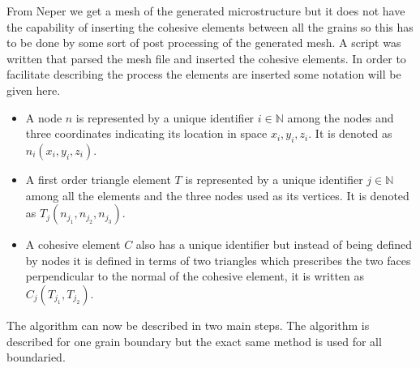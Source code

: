 \documentclass[grain_boundary_law.tex]{subfiles}
\begin{document}
From Neper we get a mesh of the generated microstructure but it does not have the capability of inserting the cohesive elements between all the grains so this has to be done by some sort of post processing of the generated mesh. A script was written that parsed the mesh file and inserted the cohesive elements. In order to facilitate describing the process the elements are inserted some notation will be given here. 

\begin{itemize}
\item A node $n$ is represented by a unique identifier $i \in \mathbb{N}$ among the nodes and three coordinates indicating its location in space $x_i,y_i,z_i$. It is denoted as $n_i(x_i,y_i,z_i)$.
\item A first order triangle element $T$ is represented by a unique identifier $j \in \mathbb{N}$ among all the elements and the three nodes used as its vertices. It is denoted as $T_j(n_{j_1}, n_{j_2}, n_{j_3})$. 
\item A cohesive element $C$ also has a unique identifier but instead of being defined by nodes it is defined in terms of two triangles which prescribes the two faces perpendicular to the normal of the cohesive element, it is written as $C_j(T_{j_1}, T_{j_2})$.
\end{itemize}
The algorithm can now be described in two main steps. The algorithm is described for one grain boundary but the exact same method is used for all boundaried.
\end{document}
